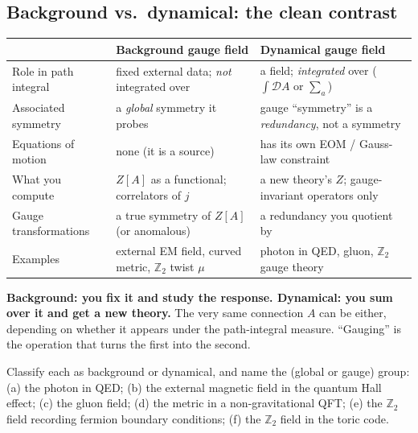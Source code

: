 \documentclass[11pt]{article}
\newcommand{\Ztwo}{\mathbb{Z}_2}
\begin{document}
\subsection{Background vs.\ dynamical: the clean contrast}

\begin{center}
\renewcommand{\arraystretch}{1.35}
\begin{tabular}{p{}|p{}|p{}}
 & \textbf{Background gauge field} & \textbf{Dynamical gauge field}\\\hline
Role in path integral & fixed external data; \emph{not} integrated over & a field; \emph{integrated} over ($\int\mathcal D A$ or $\sum_a$)\\
Associated symmetry & a \emph{global} symmetry it probes & gauge ``symmetry'' is a \emph{redundancy}, not a symmetry\\
Equations of motion & none (it is a source) & has its own EOM / Gauss-law constraint\\
What you compute & $Z[A]$ as a functional; correlators of $j$ & a new theory's $Z$; gauge-invariant operators only\\
Gauge transformations & a true symmetry of $Z[A]$ (or anomalous) & a redundancy you quotient by\\
Examples & external EM field, curved metric, $\Ztwo$ twist $\mu$ & photon in QED, gluon, $\Ztwo$ gauge theory\\
\end{tabular}
\end{center}

\begin{nnote}
\textbf{Background: you fix it and study the response. Dynamical: you sum over it and
get a new theory.} The very same connection $A$ can be either, depending on whether it
appears under the path-integral measure. ``Gauging'' is the operation that turns the
first into the second.
\end{nnote}

\begin{xca}
Classify each as background or dynamical, and name the (global or gauge) group:
(a) the photon in QED; (b) the external magnetic field in the quantum Hall effect;
(c) the gluon field; (d) the metric in a non-gravitational QFT; (e) the $\Ztwo$ field
recording fermion boundary conditions; (f) the $\Ztwo$ field in the toric code.
\end{xca}
\end{document}

